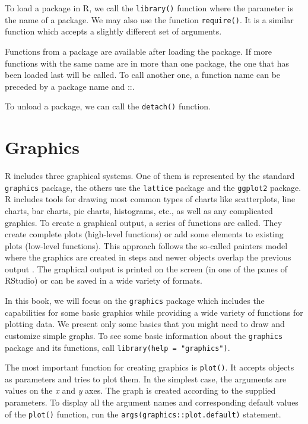 To load a package in R, we call the \texttt{library()} function where the parameter 
is the name of a package. We may also use the function \texttt{require()}. 
It is a similar function which accepts a slightly different set of arguments.

Functions from a package are available after loading the package. If more
functions with the same name are in more than one package, the one that has
been loaded last will be called. To call another one, a function name can be
preceded by a package name and ::.

To unload a package, we can call the \texttt{detach()} function.

\section{Graphics}

R includes three graphical systems. One of them is represented by the standard 
\texttt{graphics} package, the others use the \texttt{lattice} package and the 
\texttt{ggplot2} package. R includes tools for drawing most common types of 
charts like scatterplots, line charts, bar charts, pie charts, histograms, etc., 
as well as any complicated graphics. To create a graphical output, a series of 
functions are called. They create complete plots (high-level functions) or add 
some elements to existing plots (low-level functions). This approach follows 
the so-called painters model where the graphics are created in steps and newer 
objects overlap the previous output \cite{ref204}. The graphical output is printed 
on the screen (in one of the panes of RStudio) or can be saved in a wide variety 
of formats.

In this book, we will focus on the \texttt{graphics} package which includes the 
capabilities for some basic graphics while providing a wide variety of functions 
for plotting data. We present only some basics that you might need to draw and 
customize simple graphs. To see some basic information about the 
\texttt{graphics} package and its functions, call 
\texttt{library(help = "graphics")}.

The most important function for creating graphics is \texttt{plot()}. It accepts 
objects as parameters and tries to plot them. In the simplest case, the arguments 
are values on the \textit{x} and \textit{y} axes. The graph is created according 
to the supplied parameters. To display all the argument names and corresponding 
default values of the \texttt{plot()} function, run the 
\texttt{args(graphics::plot.default)} statement.

